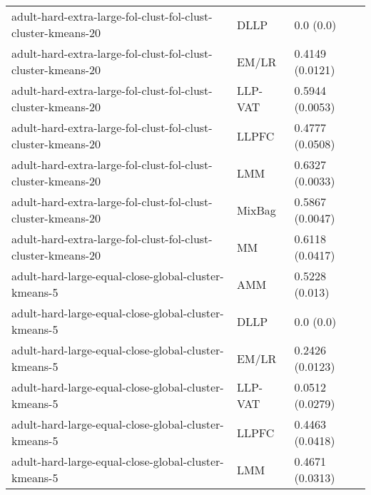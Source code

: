 \begin{longtable}{lll}
                                                 adult-hard-extra-large-fol-clust-fol-clust-cluster-kmeans-20 &      DLLP &                                 0.0 (0.0) \\
                                                 adult-hard-extra-large-fol-clust-fol-clust-cluster-kmeans-20 &     EM/LR &                           0.4149 (0.0121) \\
                                                 adult-hard-extra-large-fol-clust-fol-clust-cluster-kmeans-20 &   LLP-VAT &                           0.5944 (0.0053) \\
                                                 adult-hard-extra-large-fol-clust-fol-clust-cluster-kmeans-20 &     LLPFC &                           0.4777 (0.0508) \\
                                                 adult-hard-extra-large-fol-clust-fol-clust-cluster-kmeans-20 &       LMM &                           0.6327 (0.0033) \\
                                                 adult-hard-extra-large-fol-clust-fol-clust-cluster-kmeans-20 &    MixBag &                           0.5867 (0.0047) \\
                                                 adult-hard-extra-large-fol-clust-fol-clust-cluster-kmeans-20 &        MM &                           0.6118 (0.0417) \\
                                                         adult-hard-large-equal-close-global-cluster-kmeans-5 &       AMM &                            0.5228 (0.013) \\
                                                         adult-hard-large-equal-close-global-cluster-kmeans-5 &      DLLP &                                 0.0 (0.0) \\
                                                         adult-hard-large-equal-close-global-cluster-kmeans-5 &     EM/LR &                           0.2426 (0.0123) \\
                                                         adult-hard-large-equal-close-global-cluster-kmeans-5 &   LLP-VAT &                           0.0512 (0.0279) \\
                                                         adult-hard-large-equal-close-global-cluster-kmeans-5 &     LLPFC &                           0.4463 (0.0418) \\
                                                         adult-hard-large-equal-close-global-cluster-kmeans-5 &       LMM &                           0.4671 (0.0313) \\

\end{longtable}
